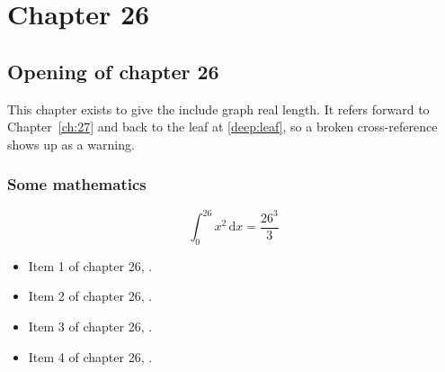 \chapter{Chapter 26}
\label{ch:26}
\section{Opening of chapter 26}
This chapter exists to give the include graph real length. It refers
forward to Chapter~\ref{ch:27} and back to the leaf
at \ref{deep:leaf}, so a broken cross-reference shows up as a warning.

\subsection{Some mathematics}
\begin{equation}
  \int_0^{26} x^{2} \, \mathrm{d}x = \frac{26^{3}}{3}
\end{equation}

\begin{itemize}
  \item Item 1 of chapter 26, .
  \item Item 2 of chapter 26, .
  \item Item 3 of chapter 26, .
  \item Item 4 of chapter 26, .
\end{itemize}
